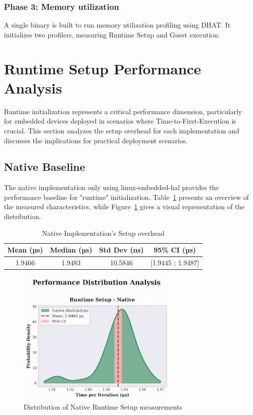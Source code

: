 \subsubsection{Phase 3: Memory utilization}
A single binary is built to run memory utilization profiling using DHAT. It initializes two profilers, measuring Runtime Setup and Guest execution.

\section{Runtime Setup Performance Analysis}
\label{sec:eval-setup}

Runtime initialization represents a critical performance dimension, particularly for embedded devices deployed in scenarios where Time-to-First-Execution is crucial. This section analyzes the setup overhead for each implementation and discusses the implications for practical deployment scenarios.

\subsection{Native Baseline}
\label{subsec:eval-setup-native}

The native implementation only using linux-embedded-hal provides the performance baseline for "runtime" initialization. Table~\ref{tab:native-setup} presents an overview of the measured characteristics, while Figure~\ref{fig:native-setup-distribution} gives a visual representation of the distribution.

\begin{table}[h]
    \centering
    \caption{Native Implementation's Setup overhead}
    \label{tab:native-setup}
    \begin{tabular}{cccc}
        \toprule
        \textbf{Mean (µs)} & \textbf{Median (µs)} & \textbf{Std Dev (ns)} & \textbf{95\% CI (µs)} \\
        \midrule
        1.9466 & 1.9483 & 10.5846 & [1.9445 ; 1.9487] \\
        \bottomrule
    \end{tabular}
\end{table}

\begin{figure}[h]
    \centering
    \includegraphics[width=0.7\textwidth]{images/native-setup-distribution}
    \caption{Distribution of Native Runtime Setup measurements}
    \label{fig:native-setup-distribution}
\end{figure}

